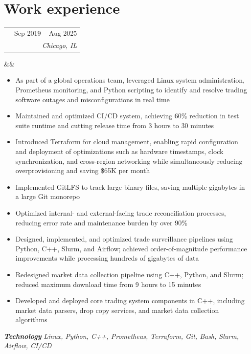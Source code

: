 \documentclass[10pt,letterpaper]{moderncv}
\makeatletter
\renewcommand*{\cventry}[7][.25em]{%
  \begin{tabular*}{\maincolumnwidth}{l@{\extracolsep{\fill}}r}%
    \ifboolexpr{%
      test {\ifstrempty{#4}}
      and
      test {\ifstrempty{#2}}}%
      {}%
      {{\fontsize{9}{10.8}\selectfont\bfseries #4} & {#2}\\}%
    {\itshape #3\ifstrempty{#6}{}{, #6}} & {\itshape #5}\\%
  \end{tabular*}%
  \ifx&#7&%
  \else{\\%
    \begin{minipage}{\maincolumnwidth}%
      \small#7%
    \end{minipage}}\fi%
  \par\addvspace{#1}}
\makeatother
\begin{document}
\makecvtitle
\vspace{-2.6em}
\fontsize{8}{9.6}\selectfont

\section{Work experience}

\cventry{Sep 2019 -- Aug 2025}{Quantitative Technologist}{\textcolor[rgb]{0,0,1}{Radix Trading, LLC}}{Chicago, IL}{}{}
\begin{itemize}
  \item As part of a global operations team, leveraged Linux system administration, Prometheus monitoring, and Python scripting to identify and resolve trading software outages and misconfigurations in real time
  \item Maintained and optimized CI/CD system, achieving 60\% reduction in test suite runtime and cutting release time from 3 hours to 30 minutes
  \item Introduced Terraform for cloud management, enabling rapid configuration and deployment of optimizations such as hardware timestamps, clock synchronization, and cross-region networking while simultaneously reducing overprovisioning and saving \$65K per month
  \item Implemented GitLFS to track large binary files, saving multiple gigabytes in a large Git monorepo
  \item Optimized internal- and external-facing trade reconciliation processes, reducing error rate and maintenance burden by over 90\%
  \item Designed, implemented, and optimized trade surveillance pipelines using Python, C++, Slurm, and Airflow; achieved order-of-magnitude performance improvements while processing hundreds of gigabytes of data
  \item Redesigned market data collection pipeline using C++, Python, and Slurm; reduced maximum download time from 9 hours to 15 minutes
  \item Developed and deployed core trading system components in C++, including market data parsers, drop copy services, and market data collection algorithms
\end{itemize}
\vspace{0.2em}
\textbf{\textit{Technology}} \textit{Linux, Python, C++, Prometheus, Terraform, Git, Bash, Slurm, Airflow, CI/CD}

\vspace{0.4em}
\end{document}
